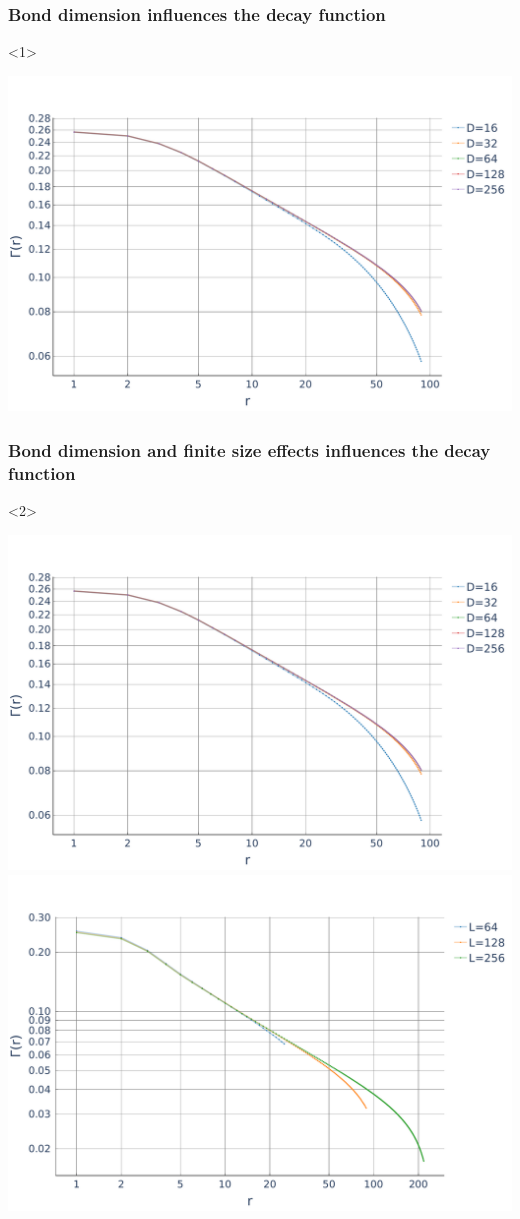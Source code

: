 \documentclass[aspectratio=169]{beamer}
\renewcommand\emph[1]{\textcolor{ugent_blue}{\textbf{#1}}}
\begin{document}
\begin{frame}
  \frametitle<1>{Bond dimension influences the decay function}
  \begin{onlyenv}<1>
    \begin{center}
      \includegraphics[scale=0.3]{../img/Correlations-bonds.pdf}
    \end{center}
  \end{onlyenv}
  \frametitle<2>{Bond dimension \emph{and finite size effects} influences the decay function}
  \begin{onlyenv}<2>
    \begin{center}
      \includegraphics[scale=0.22]{../img/Correlations-bonds.pdf}
      \includegraphics[scale=0.22]{../img/Correlations-lengths.pdf}

\end{center}
\end{onlyenv}
\end{frame}
\end{document}
